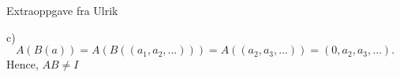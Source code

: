 \documentclass[a4paper,norsk]{article}
\begin{document}
\begin{oppgavebox}{Extraoppgave fra Ulrik}{}
\begin{itemize}
\begin{proofbox}{c)}{}
        \[
            A(B(a)) = A(B( \left( a_1, a_2, ... \right))) = A( \left( a_2, a_3, ... \right) )  = \left( 0, a_2, a_3, ... \right).
        \]
        Hence, $ AB \neq I $ 
    \end{proofbox}
\end{itemize}

\end{oppgavebox}
\end{document}
